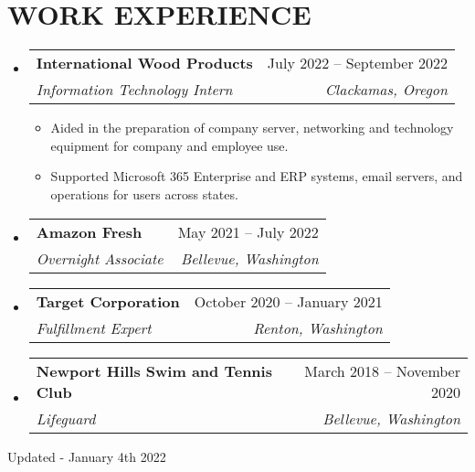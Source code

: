 \documentclass[letterpaper,11pt]{article}
\makeatletter
\newcommand{\resumeItem}[1]{
  \item\small{
    {#1 \vspace{-2pt}}
  }
}
\newcommand{\resumeSubheading}[4]{
  \vspace{-2pt}\item
    \begin{tabular*}{0.97\textwidth}[t]{l@{\extracolsep{\fill}}r}
      \textbf{#1} & #2 \\
      \textit{\small#3} & \textit{\small #4} \\
    \end{tabular*}\vspace{-7pt}
}
\newcommand{\resumeSubHeadingListStart}{\begin{itemize}[leftmargin=0.15in, label={}]}
\newcommand{\resumeSubHeadingListEnd}{\end{itemize}}
\newcommand{\resumeItemListStart}{\begin{itemize}}
\newcommand{\resumeItemListEnd}{\end{itemize}\vspace{-5pt}}
\makeatother
\begin{document}
\section{WORK EXPERIENCE}
  \resumeSubHeadingListStart

    \resumeSubheading
      {International Wood Products}{July 2022 -- September 2022}
      {Information Technology Intern}{Clackamas, Oregon}
      \resumeItemListStart
        \resumeItem{Aided in the preparation of company server, networking and technology equipment for company and employee use.}
        \resumeItem{Supported Microsoft 365 Enterprise and ERP systems, email servers, and operations for users across states.}
      \resumeItemListEnd

    \resumeSubheading
      {Amazon Fresh}{May 2021 -- July 2022}
      {Overnight Associate}{Bellevue, Washington}

    \resumeSubheading
      {Target Corporation}{October 2020 -- January 2021}
      {Fulfillment Expert}{Renton, Washington}

    \resumeSubheading
      {Newport Hills Swim and Tennis Club}{March 2018 -- November 2020}
      {Lifeguard}{Bellevue, Washington}

  \resumeSubHeadingListEnd

\begin{center}
    \tiny Updated - January 4th 2022
\end{center}
\end{document}
